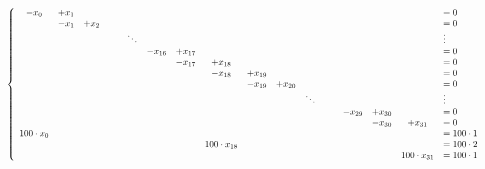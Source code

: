 \documentclass[notitlepage]{report}
\begin{document}
\begin{equation}
\nonumber
\resizebox{\hsize}{!}{
$\left\{
\begin{array}{cccccccccccccccccl}
-x_0 & +x_1  &      &      &         &        &            &         &         &         &            &        &            &         &         &         &         &= 0 \\
     &  -x_1 & +x_2 &      &         &        &            &         &         &         &            &        &            &         &         &         &         &= 0 \\
     &       &      &      &         & \ddots &            &         &         &         &            &        &            &         &         &         &         &  \vdots   \\
     &       &      &      &         &        &    -x_{16} & +x_{17} &         &         &            &        &            &         &         &         &         &= 0 \\
     &       &      &      &         &        &            & -x_{17} & +x_{18} &         &            &        &            &         &         &         &         &= 0 \\
     &       &      &      &         &        &            &         & -x_{18} & +x_{19} &            &        &            &         &         &         &         &= 0 \\
     &       &      &      &         &        &            &         &         & -x_{19} & +x_{20}    &        &            &         &         &         &         &= 0 \\
     &       &      &      &         &        &            &         &         &         &            & \ddots &            &         &         &         &         &  \vdots  \\
     &       &      &      &         &        &            &         &         &         &            &        &            &         & -x_{29} & +x_{30} &         &= 0 \\
     &       &      &      &         &        &            &         &         &         &            &        &            &         &         & -x_{30} & +x_{31} &= 0 \\
100\cdot x_{0}     &       &      &      &         &        &            &         &         &         &            &        &            &         &         &         &  &= 100\cdot 1 \\
     &       &      &      &         &        &            &         & 100\cdot x_{18} &         &            &        &            &         &         &         &         &= 100\cdot 2 \\
     &       &      &      &         &        &            &         &         &         &            &        &            &         &         &         & 100\cdot x_{31} &= 100\cdot 1 \\
\end{array}
\right.$
}
\end{equation}
\end{document}
